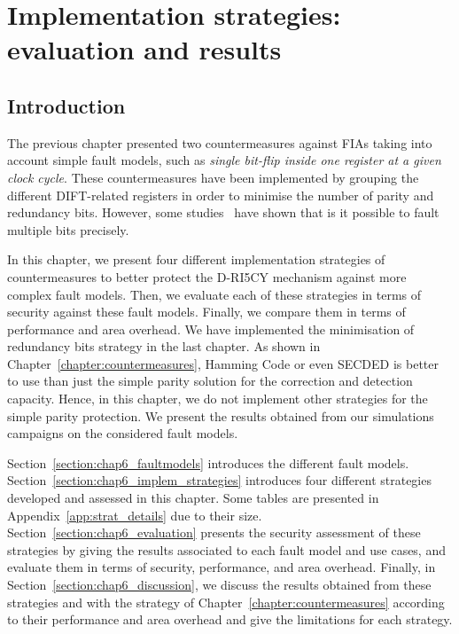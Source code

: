 \chapter{Implementation strategies: evaluation and results}
\label{chapter:exp_setup_results}
\minitoc

\section{Introduction}
The previous chapter presented two countermeasures against FIAs taking into account simple fault models, such as \textit{single bit-flip inside one register at a given clock cycle}. These countermeasures have been implemented by grouping the different DIFT-related registers in order to minimise the number of parity and redundancy bits. However, some studies~\cite{CGVCBLC-22-cardis,VDSPB-24-jce} have shown that is it possible to fault multiple bits precisely.

In this chapter, we present four different implementation strategies of countermeasures to better protect the D-RI5CY mechanism against more complex fault models. Then, we evaluate each of these strategies in terms of security against these fault models. Finally, we compare them in terms of performance and area overhead. We have implemented the minimisation of redundancy bits strategy in the last chapter. As shown in Chapter~\ref{chapter:countermeasures}, Hamming Code or even SECDED is better to use than just the simple parity solution for the correction and detection capacity. Hence, in this chapter, we do not implement other strategies for the simple parity protection. We present the results obtained from our simulations campaigns on the considered fault models.

Section~\ref{section:chap6_faultmodels} introduces the different fault models.
Section~\ref{section:chap6_implem_strategies} introduces four different strategies developed and assessed in this chapter. Some tables are presented in Appendix~\ref{app:strat_details} due to their size.
Section~\ref{section:chap6_evaluation} presents the security assessment of these strategies by giving the results associated to each fault model and use cases, and evaluate them in terms of security, performance, and area overhead.
Finally, in Section~\ref{section:chap6_discussion}, we discuss the results obtained from these strategies and with the strategy of Chapter~\ref{chapter:countermeasures} according to their performance and area overhead and give the limitations for each strategy.

